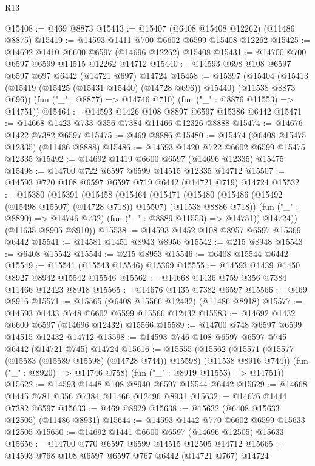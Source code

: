 \begin{lexlean}{R13}
\begin{coremodule}
@15408 := @469 @8873
@15413 := @15407 (@6408 @15408 @12262) (@11486 @8875)
@15419 := @14593 @1411 @700 @6602 @6599 @15408 @12262
@15425 := @14692 @1410 @6600 @6597 (@14696 @12262) @15408
@15431 := @14700 @700 @6597 @6599 @14515 @12262 @14712
@15440 := @14593 @698 @108 @6597 @6597 @697 @6442 (@14721 @697) @14724
@15458 := @15397
    (@15404
      (@15413 (@15419 (@15425 (@15431 @15440) (@14728 @696)) @15440) (@11538 @8873 @696))
      (fun ("_" : @8877) => @14746 @710)
      (fun ("_" : @8876 @11553) => @14751))
@15464 := @14593 @1426 @108 @8897 @6597 @15386 @6442
@15471 := @14668 @1423 @733 @356 @7384 @11466 @12326 @8888
@15474 := @14676 @1422 @7382 @6597
@15475 := @469 @8886
@15480 := @15474 (@6408 @15475 @12335) (@11486 @8888)
@15486 := @14593 @1420 @722 @6602 @6599 @15475 @12335
@15492 := @14692 @1419 @6600 @6597 (@14696 @12335) @15475
@15498 := @14700 @722 @6597 @6599 @14515 @12335 @14712
@15507 := @14593 @720 @108 @6597 @6597 @719 @6442 (@14721 @719) @14724
@15532 := @15380
    (@15391
      (@15458
        (@15464
          (@15471
            (@15480 (@15486 (@15492 (@15498 @15507) (@14728 @718)) @15507) (@11538 @8886 @718))
            (fun ("_" : @8890) => @14746 @732)
            (fun ("_" : @8889 @11553) => @14751))
          @14724))
      (@11635 @8905 @8910))
@15538 := @14593 @1452 @108 @8957 @6597 @15369 @6442
@15541 := @14581 @1451 @8943 @8956
@15542 := @215 @8948
@15543 := @6408 @15542
@15544 := @215 @8953
@15546 := @6408 @15544 @6442
@15549 := @15541 (@15543 @15546) @15369
@15555 := @14593 @1439 @1450 @8927 @8942 @15542 @15546
@15562 := @14668 @1436 @759 @356 @7384 @11466 @12423 @8918
@15565 := @14676 @1435 @7382 @6597
@15566 := @469 @8916
@15571 := @15565 (@6408 @15566 @12432) (@11486 @8918)
@15577 := @14593 @1433 @748 @6602 @6599 @15566 @12432
@15583 := @14692 @1432 @6600 @6597 (@14696 @12432) @15566
@15589 := @14700 @748 @6597 @6599 @14515 @12432 @14712
@15598 := @14593 @746 @108 @6597 @6597 @745 @6442 (@14721 @745) @14724
@15616 := @15555
    (@15562
      (@15571 (@15577 (@15583 (@15589 @15598) (@14728 @744)) @15598) (@11538 @8916 @744))
      (fun ("_" : @8920) => @14746 @758)
      (fun ("_" : @8919 @11553) => @14751))
@15622 := @14593 @1448 @108 @8940 @6597 @15544 @6442
@15629 := @14668 @1445 @781 @356 @7384 @11466 @12496 @8931
@15632 := @14676 @1444 @7382 @6597
@15633 := @469 @8929
@15638 := @15632 (@6408 @15633 @12505) (@11486 @8931)
@15644 := @14593 @1442 @770 @6602 @6599 @15633 @12505
@15650 := @14692 @1441 @6600 @6597 (@14696 @12505) @15633
@15656 := @14700 @770 @6597 @6599 @14515 @12505 @14712
@15665 := @14593 @768 @108 @6597 @6597 @767 @6442 (@14721 @767) @14724

\end{coremodule}
\end{lexlean}
